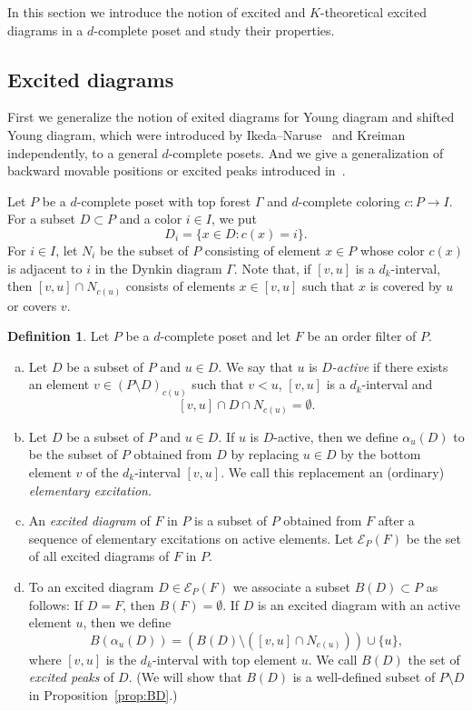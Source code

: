 \documentclass[10pt]{amsart}
\theoremstyle{definition}
\newtheorem{defi}[theo]{Definition}
\theoremstyle{remark}
\newcommand\EE{\mathcal{E}}
\begin{document}
In this section we introduce the notion of excited and $K$-theoretical excited diagrams 
in a $d$-complete poset and study their properties.

\subsection{%
Excited diagrams
}

First we generalize the notion of exited diagrams for Young diagram and shifted Young diagram, 
which were introduced by Ikeda--Naruse~\cite{IN1} and Kreiman~\cite{Kr1, Kr2} independently, 
to a general $d$-complete posets.
And we give a generalization of backward movable positions or excited peaks 
introduced in~\cite{IN2, KN, MPP}.

Let $P$ be a $d$-complete poset with top forest $\Gamma$ and $d$-complete coloring $c : P \to I$.
For a subset $D \subset P$ and a color $i \in I$, we put
$$
D_i = \{ x \in D : c(x) = i \}.
$$
For $i \in I$, let $N_i$ be the subset of $P$ consisting of element $x \in P$ whose color 
$c(x)$ is adjacent to $i$ in the Dynkin diagram $\Gamma$.
Note that, if $[v,u]$ is a $d_k$-interval, then $[v,u] \cap N_{c(u)}$ consists of elements $x \in [v,u]$ 
such that $x$ is covered by $u$ or covers $v$.

\begin{defi}
\label{def:excited}
Let $P$ be a $d$-complete poset and let $F$ be an order filter of $P$.
\begin{enumerate}[(a)]
\item\label{defi3.1_a} %
Let $D$ be a subset of $P$ and $u \in D$.
We say that $u$ is \emph{$D$-active} 
if there exists an element $v \in (P \setminus D)_{c(u)}$ 
such that $v < u$, $[v,u]$ is a $d_k$-interval and
$$
[v,u] \cap D \cap N_{c(u)} = \emptyset.
$$
\item\label{defi3.1_b} %
Let $D$ be a subset of $P$ and $u \in D$.
If $u$ is $D$-active, then we define $\alpha_u(D)$ to be the subset of $P$ obtained from $D$ by 
replacing $u \in D$ by the bottom element $v$ of the $d_k$-interval $[v,u]$.
We call this replacement an (ordinary) \emph{elementary excitation}.
\item\label{defi3.1_c} %
An \emph{excited diagram} of $F$ in $P$ is a subset of $P$ 
obtained from $F$ after a sequence of elementary excitations on active elements. 
Let $\EE_P(F)$ be the set of all excited diagrams of $F$ in $P$.
\item\label{defi3.1_d} %
To an excited diagram $D \in \EE_P(F)$ we associate a subset $B(D) \subset P$ as follows:
If $D = F$, then $B(F) = \emptyset$.
If $D$ is an excited diagram with an active element $u$, then we define
$$
B(\alpha_u(D))
 = 
\left( B(D) \setminus ([v,u] \cap N_{c(u)}) \right) \cup \{ u \},
$$
where $[v,u]$ is the $d_k$-interval with top element $u$.
We call $B(D)$ the set of \emph{excited peaks} of $D$.
(We will show that $B(D)$ is a well-defined subset of $P \setminus D$ in Proposition~\ref{prop:BD}.)
\end{enumerate}
\end{defi}
\end{document}
